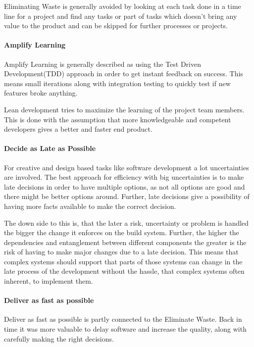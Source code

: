 \documentclass{sig-alternate}
\begin{document}
Eliminating Waste is generally avoided by looking at each task done in a time line for a project
and find any tasks or part of tasks which doesn't bring any value to the product and can be 
skipped for further processes or projects.
 
\paragraph{Amplify Learning}
Amplify Learning is generally described as using the Test Driven Development(TDD) approach in order to 
get instant feedback on success.
This means small iterations along with integration testing to quickly test if new features broke anything.

Lean development tries to maximize the learning of the project team members. 
This is done with the assumption that more knowledgeable and competent developers gives a better and 
faster end product.

\paragraph{Decide as Late as Possible}
For creative and design based tasks like software development a lot uncertainties are involved. 
The best approach for efficiency with big uncertainties is to make late decisions in order to have multiple
options, as not all options are good and there might be better options around. Further, late decisions 
give a possibility of having more facts available to make the correct decision.

The down side to this is, that the later a risk, uncertainty or problem is handled the bigger the change it 
enforces on the build system. Further, the higher the dependencies and entanglement between different 
components the greater is the risk of having to make major changes due to a late decision. This means that 
complex systems should support that parts of those systems can change in the late process
of the development without the hassle, that complex systems often inherent, to implement them.

\paragraph{Deliver as fast as possible}
Deliver as fast as possible is partly connected to the Eliminate Waste. 
Back in time it was more valuable to delay software and increase the quality, along with carefully making 
the right decisions.
\end{document}

